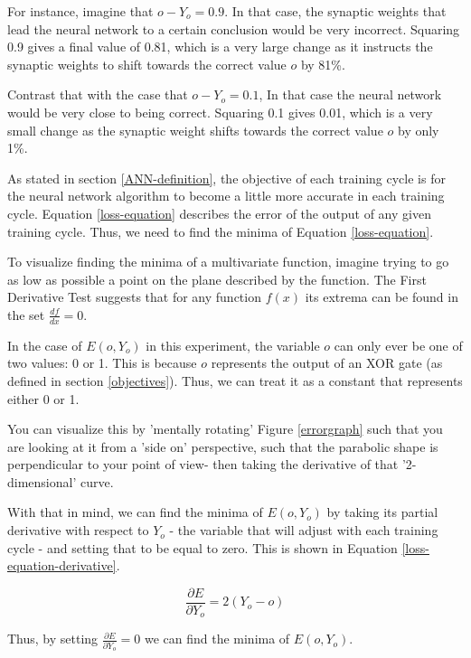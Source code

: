 \documentclass[12pt]{article}
\begin{document}
For instance, imagine that $o - Y_o = 0.9$. In that case, the synaptic weights that lead the neural network to a certain conclusion would be very incorrect. Squaring 0.9 gives a final value of 0.81, which is a very large change as it instructs the synaptic weights to shift towards the correct value $o$ by 81\%.

Contrast that with the case that $o - Y_o = 0.1$, In that case the neural network would be very close to being correct. Squaring 0.1 gives 0.01, which is a very small change as the synaptic weight shifts towards the correct value $o$ by only 1\%.

As stated in section \ref{ANN-definition}, the objective of each training cycle is for the neural network algorithm to become a little more accurate in each training cycle. Equation \ref{loss-equation} describes the error of the output of any given training cycle. Thus, we need to find the minima of Equation \ref{loss-equation}.

To visualize finding the minima of a multivariate function, imagine trying to go as low as possible a point on the plane described by the function. The First Derivative Test suggests that for any function $f(x)$ its extrema can be found in the set $\frac{df}{dx} = 0$.

In the case of \(E(o, Y_o)\) in this experiment, the variable $o$ can only ever be one of two values: 0 or 1. This is because $o$ represents the output of an XOR gate (as defined in section \ref{objectives}). Thus, we can treat it as a constant that represents either 0 or 1.

You can visualize this by 'mentally rotating' Figure \ref{errorgraph} such that you are looking at it from a 'side on' perspective, such that the parabolic shape is perpendicular to your point of view- then taking the derivative of that '2-dimensional' curve.

With that in mind, we can find the minima of $E(o, Y_o)$ by taking its partial derivative with respect to $Y_o$ - the variable that will adjust with each training cycle - and setting that to be equal to zero. This is shown in Equation \ref{loss-equation-derivative}.

\begin{equation} \label{loss-equation-derivative}
  \frac{\partial E}{\partial Y_o} = 2 (Y_o - o)
\end{equation}

Thus, by setting $\frac{\partial E}{\partial Y_o} = 0$ we can find the minima of $E(o, Y_o)$.
\end{document}

